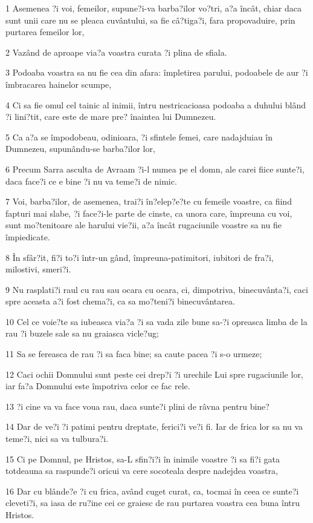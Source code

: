 \par 1 Asemenea ?i voi, femeilor, supune?i-va barba?ilor vo?tri, a?a încât, chiar daca sunt unii care nu se pleaca cuvântului, sa fie câ?tiga?i, fara propovaduire, prin purtarea femeilor lor,
\par 2 Vazând de aproape via?a voastra curata ?i plina de sfiala.
\par 3 Podoaba voastra sa nu fie cea din afara: împletirea parului, podoabele de aur ?i îmbracarea hainelor scumpe,
\par 4 Ci sa fie omul cel tainic al inimii, întru nestricacioasa podoaba a duhului blând ?i lini?tit, care este de mare pre? înaintea lui Dumnezeu.
\par 5 Ca a?a se împodobeau, odinioara, ?i sfintele femei, care nadajduiau în Dumnezeu, supunându-se barba?ilor lor,
\par 6 Precum Sarra asculta de Avraam ?i-l numea pe el domn, ale carei fiice sunte?i, daca face?i ce e bine ?i nu va teme?i de nimic.
\par 7 Voi, barba?ilor, de asemenea, trai?i în?elep?e?te cu femeile voastre, ca fiind fapturi mai slabe, ?i face?i-le parte de cinste, ca unora care, împreuna cu voi, sunt mo?tenitoare ale harului vie?ii, a?a încât rugaciunile voastre sa nu fie împiedicate.
\par 8 În sfâr?it, fi?i to?i într-un gând, împreuna-patimitori, iubitori de fra?i, milostivi, smeri?i.
\par 9 Nu rasplati?i raul cu rau sau ocara cu ocara, ci, dimpotriva, binecuvânta?i, caci spre aceasta a?i fost chema?i, ca sa mo?teni?i binecuvântarea.
\par 10 Cel ce voie?te sa iubeasca via?a ?i sa vada zile bune sa-?i opreasca limba de la rau ?i buzele sale sa nu graiasca vicle?ug;
\par 11 Sa se fereasca de rau ?i sa faca bine; sa caute pacea ?i s-o urmeze;
\par 12 Caci ochii Domnului sunt peste cei drep?i ?i urechile Lui spre rugaciunile lor, iar fa?a Domnului este împotriva celor ce fac rele.
\par 13 ?i cine va va face voua rau, daca sunte?i plini de râvna pentru bine?
\par 14 Dar de ve?i ?i patimi pentru dreptate, ferici?i ve?i fi. Iar de frica lor sa nu va teme?i, nici sa va tulbura?i.
\par 15 Ci pe Domnul, pe Hristos, sa-L sfin?i?i în inimile voastre ?i sa fi?i gata totdeauna sa raspunde?i oricui va cere socoteala despre nadejdea voastra,
\par 16 Dar cu blânde?e ?i cu frica, având cuget curat, ca, tocmai în ceea ce sunte?i cleveti?i, sa iasa de ru?ine cei ce graiesc de rau purtarea voastra cea buna întru Hristos.

